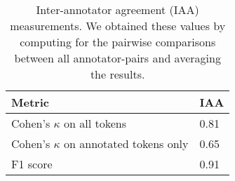 \documentclass[../report.tex]{subfiles}
\begin{document}
\begin{table}[t]
\begin{tabular}{@{}p{6cm}p{1.25cm}@{}}
\toprule
Metric &  IAA  \\ \midrule
Cohen's $\kappa$ on all tokens & 0.81 \\
Cohen's $\kappa$ on annotated tokens only & 0.65 \\
F1 score & 0.91 \\ \bottomrule
\end{tabular}
\caption{
    Inter-annotator agreement (IAA) measurements.
    We obtained these values by computing for the pairwise comparisons between all annotator-pairs and averaging the results.
}
\label{table:iaa}
\end{table}
\end{document}
